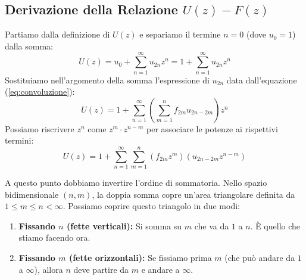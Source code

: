 \subsection{Derivazione della Relazione $U(z) - F(z)$}
Partiamo dalla definizione di $U(z)$ e separiamo il termine $n=0$ (dove $u_0=1$) dalla somma:
\begin{equation}
    U(z) = u_0 + \sum_{n=1}^{\infty} u_{2n} z^n = 1 + \sum_{n=1}^{\infty} u_{2n} z^n
\end{equation}
Sostituiamo nell'argomento della somma l'espressione di $u_{2n}$ data dall'equazione (\ref{eq:convoluzione}):
\begin{equation}
    U(z) = 1 + \sum_{n=1}^{\infty} \left( \sum_{m=1}^{n} f_{2m} u_{2n-2m} \right) z^n
\end{equation}
Possiamo riscrivere $z^n$ come $z^m \cdot z^{n-m}$ per associare le potenze ai rispettivi termini:
\begin{equation}
    U(z) = 1 + \sum_{n=1}^{\infty} \sum_{m=1}^{n} (f_{2m} z^m) (u_{2n-2m} z^{n-m})
\end{equation}

A questo punto dobbiamo invertire l'ordine di sommatoria. Nello spazio bidimensionale $(n, m)$, la doppia somma copre un'area triangolare definita da $1 \le m \le n < \infty$. Possiamo coprire questo triangolo in due modi:
\begin{enumerate}
    \item \textbf{Fissando $n$ (fette verticali):} Si somma su $m$ che va da $1$ a $n$. È quello che stiamo facendo ora.
    \item \textbf{Fissando $m$ (fette orizzontali):} Se fissiamo prima $m$ (che può andare da $1$ a $\infty$), allora $n$ deve partire da $m$ e andare a $\infty$.
\end{enumerate}

